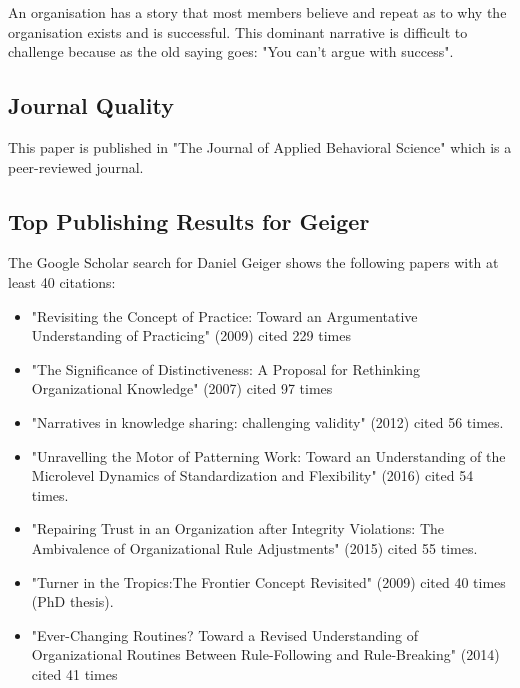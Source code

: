 An organisation has a story that most members believe and repeat as to why the organisation exists and is successful. This dominant narrative is difficult to challenge because as the old saying goes: "You can't argue with success".\\

\subsection{Journal Quality}
This paper is published in "The Journal of Applied Behavioral Science" which is a peer-reviewed journal.\\



\subsection{Top Publishing Results for Geiger}
The Google Scholar search for Daniel Geiger shows the following papers with at least 40 citations:\\

\begin{itemize}
\item "Revisiting the Concept of Practice: Toward an Argumentative Understanding of Practicing" (2009) cited 229 times
\item "The Significance of Distinctiveness: A Proposal for Rethinking Organizational Knowledge" (2007) cited 97 times
\item "Narratives in knowledge sharing: challenging validity" (2012) cited 56 times.
\item "Unravelling the Motor of Patterning Work: Toward an Understanding of the Microlevel Dynamics of Standardization and Flexibility" (2016) cited 54 times.
\item "Repairing Trust in an Organization after Integrity Violations: The Ambivalence of Organizational Rule Adjustments" (2015) cited 55 times.
\item "Turner in the Tropics:The Frontier Concept Revisited" (2009) cited 40 times (PhD thesis).
\item "Ever-Changing Routines? Toward a Revised Understanding of Organizational Routines Between Rule-Following and Rule-Breaking" (2014) cited 41 times
\end{itemize}


